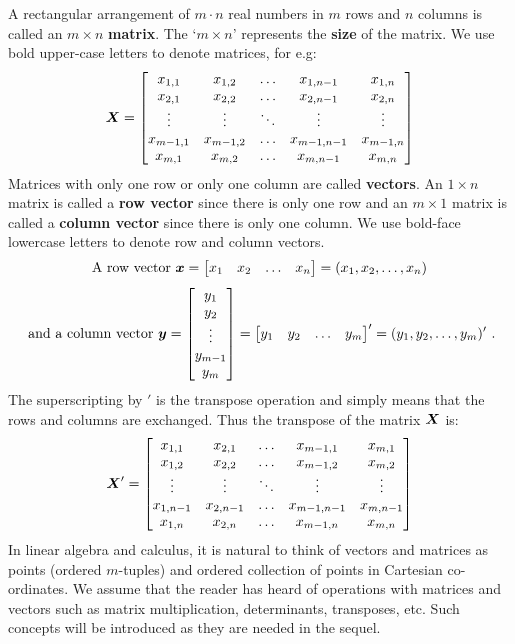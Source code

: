 A rectangular arrangement of $m \cdot n$ real numbers in $m$ rows and $n$ columns is called an $m \times n$ {\bf matrix}.  The `$m \times n$' represents the {\bf size} of the matrix.  We use bold upper-case letters to denote matrices, for e.g:
$$
\X = \begin{bmatrix}
x_{1,1} & x_{1,2} & \ldots & x_{1,n-1} & x_{1,n} \\
x_{2,1} & x_{2,2} & \ldots & x_{2,n-1} & x_{2,n} \\
\vdots & \vdots & \ddots & \vdots & \vdots \\
x_{m-1,1} & x_{m-1,2} & \ldots & x_{m-1,n-1} & x_{m-1,n} \\
x_{m,1} & x_{m,2} & \ldots & x_{m,n-1} & x_{m,n}
\end{bmatrix}
$$
Matrices with only one row or only one column are called {\bf vectors}.  An $1 \times n$ matrix is called a {\bf row vector} since there is only one row and an $m \times 1$ matrix is called a {\bf column vector} since there is only one column.  We use bold-face lowercase letters to denote row and column vectors.
$$
\text{A row vector } \x = \begin{bmatrix}
x_{1} & x_{2} & \ldots & x_{n}
\end{bmatrix} = (x_1,x_2,\ldots,x_n)
$$
$$
\text{ and a column vector } \y =
\begin{bmatrix}
y_{1} \\
y_{2}  \\
\vdots \\
y_{m-1} \\
y_{m}
\end{bmatrix}
= \begin{bmatrix}
y_{1} & y_{2} & \ldots & y_{m}
\end{bmatrix}'
= (y_1,y_2,\ldots,y_m)' \ .
$$
The superscripting by $'$ is the transpose operation and simply means that the rows and columns are exchanged.  Thus the transpose of the matrix $\X$ is:
$$
\X' = \begin{bmatrix}
x_{1,1} & x_{2,1} & \ldots & x_{m-1,1} & x_{m,1} \\
x_{1,2} & x_{2,2} & \ldots & x_{m-1,2} & x_{m,2} \\
\vdots & \vdots & \ddots & \vdots & \vdots \\
x_{1,n-1} & x_{2,n-1} & \ldots & x_{m-1,n-1} & x_{m,n-1} \\
x_{1,n} & x_{2,n} & \ldots & x_{m-1,n} & x_{m,n}
\end{bmatrix}
$$
In linear algebra and calculus, it is natural to think of vectors and matrices as points (ordered $m$-tuples) and ordered collection of points in Cartesian co-ordinates.  We assume that the reader has heard of operations with matrices and vectors such as matrix multiplication, determinants, transposes, etc.  Such concepts will be introduced as they are needed in the sequel.

